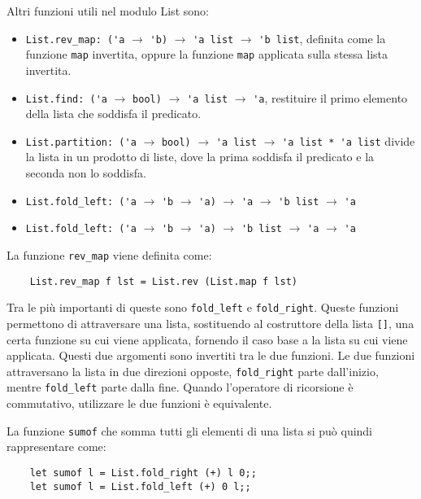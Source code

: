 \documentclass{article}
\numberwithin{equation}{subsection}
\begin{document}
Altri funzioni utili nel modulo List sono:
\begin{itemize}
    \item \verb|List.rev_map: ('a| $\rightarrow$ \verb|'b)| $\rightarrow$ \verb|'a list| $\rightarrow$ \verb|'b list|, definita come la funzione \verb|map| invertita, oppure la funzione \verb|map| applicata sulla stessa lista invertita.  
    \item \verb|List.find: ('a| $\rightarrow$ \verb|bool)| $\rightarrow$ \verb|'a list| $\rightarrow$ \verb|'a|, restituire il primo elemento della lista che soddisfa il predicato.
    \item \verb|List.partition: ('a| $\rightarrow$ \verb|bool)| $\rightarrow$ \verb|'a list| $\rightarrow$ \verb|'a list * 'a list| divide la lista in un prodotto di liste, dove la prima soddisfa il predicato e la seconda non lo soddisfa. 
    \item \verb|List.fold_left: ('a| $\rightarrow$ \verb|'b| $\rightarrow$ \verb|'a)| $\rightarrow$ \verb|'a| $\rightarrow$ \verb|'b list| $\rightarrow$ \verb|'a| 
    \item \verb|List.fold_left: ('a| $\rightarrow$ \verb|'b| $\rightarrow$ \verb|'a)| $\rightarrow$ \verb|'b list| $\rightarrow$ \verb|'a| $\rightarrow$ \verb|'a|
\end{itemize}
La funzione \verb|rev_map| viene definita come:
\begin{verbatim}
    List.rev_map f lst = List.rev (List.map f lst)    
\end{verbatim}
Tra le più importanti di queste sono \verb|fold_left| e \verb|fold_right|. 
Queste funzioni permettono di attraversare una lista, sostituendo al costruttore della lista \verb|[]|, una certa funzione su cui viene applicata, fornendo il caso base a la lista su cui viene applicata. Questi due argomenti sono invertiti tra le due funzioni. Le due funzioni attraversano la lista in due direzioni opposte, \verb|fold_right| parte dall'inizio, mentre \verb|fold_left| parte dalla fine. Quando l'operatore di ricorsione è commutativo, utilizzare le due funzioni è equivalente. 


La funzione \verb|sumof| che somma tutti gli elementi di una lista si può quindi rappresentare come:
\begin{verbatim}
    let sumof l = List.fold_right (+) l 0;;
    let sumof l = List.fold_left (+) 0 l;;    
\end{verbatim}


\clearpage
\end{document}
